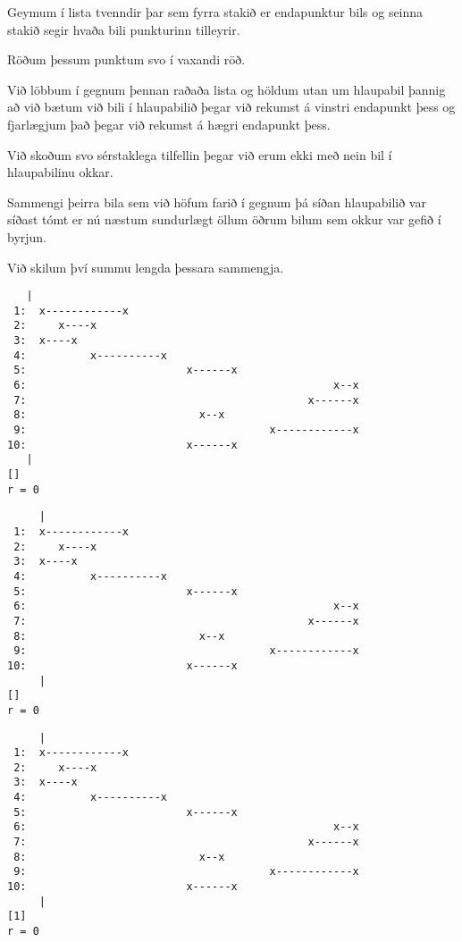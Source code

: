 {
	{
		\item<1-> Geymum í lista tvenndir þar sem fyrra stakið er endapunktur bils og seinna stakið segir hvaða bili punkturinn tilleyrir.
		\item<2-> Röðum þessum punktum svo í vaxandi röð.
		\item<3-> Við löbbum í gegnum þennan raðaða lista og höldum utan um hlaupabil þannig að
			við bætum við bili í hlaupabilið þegar við rekumst á vinstri endapunkt þess og fjarlægjum það 
			þegar við rekumst á hægri endapunkt þess. 
		\item<4-> Við skoðum svo sérstaklega tilfellin þegar við erum ekki með nein bil í hlaupabilinu okkar.
		\item<5-> Sammengi þeirra bila sem við höfum farið í gegnum þá síðan hlaupabilið var síðast tómt er nú næstum
			sundurlægt öllum öðrum bilum sem okkur var gefið í byrjun.
		\item<6-> Við skilum því summu lengda þessara sammengja.
	}
}

{ \begin{verbatim}
   |                                  
 1:  x------------x
 2:     x----x
 3:  x----x                    
 4:          x----------x
 5:                         x------x
 6:                                                x--x
 7:                                            x------x
 8:                           x--x
 9:                                      x------------x
10:                         x------x
   |                    
[]
r = 0
\end{verbatim} }

{ \begin{verbatim}
     |                                  
 1:  x------------x
 2:     x----x
 3:  x----x                    
 4:          x----------x
 5:                         x------x
 6:                                                x--x
 7:                                            x------x
 8:                           x--x
 9:                                      x------------x
10:                         x------x
     |                    
[]
r = 0
\end{verbatim} }

{ \begin{verbatim}
     |                                  
 1:  x------------x
 2:     x----x
 3:  x----x                    
 4:          x----------x
 5:                         x------x
 6:                                                x--x
 7:                                            x------x
 8:                           x--x
 9:                                      x------------x
10:                         x------x
     |                    
[1]
r = 0
\end{verbatim} }

